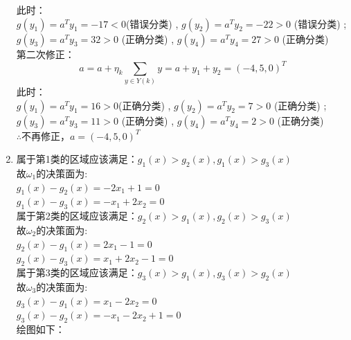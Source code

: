 \documentclass[a4paper,11pt,onecolumn,oneside,UTF8]{article}
\begin{document}
\begin{enumerate}
$$          $$
          此时：\\
          $g(y_1) = a^Ty_1 = -17 < 0 $(错误分类) , $g(y_2) = a^Ty_2 = -22 > 0$ (错误分类) ;\\
          $g(y_3) = a^Ty_3 = 32 > 0$ (正确分类) , $g(y_4) = a^Ty_4 = 27 > 0$ (正确分类) \\
          第二次修正：
          $$
              a = a + \eta_k \sum_{y\in Y(k)}y = a + y_1 + y_2 = \left(-4,5,0\right)^T
          $$
          此时：\\
          $g(y_1) = a^Ty_1 = 16 > 0 $(正确分类) , $g(y_2) = a^Ty_2 = 7 > 0$ (正确分类) ;\\
          $g(y_3) = a^Ty_3 = 11 > 0$ (正确分类) , $g(y_4) = a^Ty_4 = 2 > 0$ (正确分类) \\
          $\therefore$不再修正，$a = \left(-4,5,0\right)^T$
    \item 属于第1类的区域应该满足：$g_1(x)>g_2(x),g_1(x)>g_3(x)$ \\
          故$\omega_1$的决策面为: \\
          $g_1(x)-g_2(x) = -2x_1+1 = 0$ \\
          $g_1(x)-g_3(x) = -x_1+2x_2 = 0$ \\
          属于第2类的区域应该满足：$g_2(x)>g_1(x),g_2(x)>g_3(x)$ \\
          故$\omega_2$的决策面为: \\
          $g_2(x)-g_1(x) = 2x_1-1 = 0$ \\
          $g_2(x)-g_3(x) = x_1+2x_2-1 = 0$ \\
          属于第3类的区域应该满足：$g_3(x)>g_1(x),g_3(x)>g_2(x)$ \\
          故$\omega_3$的决策面为: \\
          $g_3(x)-g_1(x) = x_1-2x_2 = 0$ \\
          $g_3(x)-g_2(x) = -x_1-2x_2+1 = 0$ \\
          绘图如下：\\

\end{enumerate}
\end{document}
